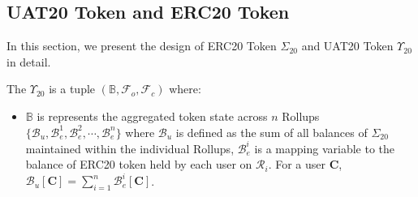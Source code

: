 \subsection{UAT20 Token and ERC20 Token}
\label{sec:design}

In this section, we present the design of ERC20 Token $\Sigma_{20}$ and UAT20 Token $\Upsilon_{20}$ in detail.



\begin{defn} The $\Upsilon_{20}$ is a tuple $(\mathbb{B}, \mathcal{F}_o, \mathcal{F}_c)$ where:
\begin{itemize}[leftmargin=*]
\item $\mathbb{B}$ is represents the aggregated token state across $n$ Rollups $\{ \mathcal{B}_u, \mathcal{B}^1_e, \mathcal{B}^2_e, \cdots, \mathcal{B}^n_e \}$ where $\mathcal{B}_u$ is defined as the sum of all balances of $\Sigma_{20}$ maintained within the individual Rollups, $\mathcal{B}^i_e$ is a mapping variable to the balance of ERC20 token held by each user on $\mathcal{R}_i$. For a user $\mathbf{C}$, 
$
\mathcal{B}_u[\mathbf{C}] = \sum_{i=1}^{n} \mathcal{B}^i_e[\mathbf{C}]$. 


\end{itemize}
\end{defn}
